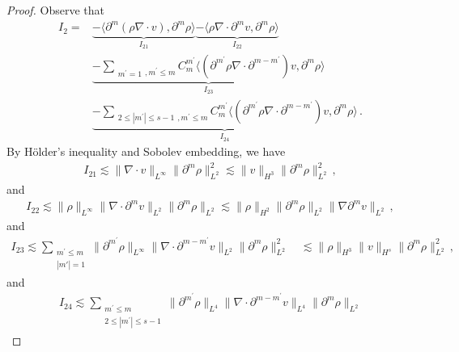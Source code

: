 \documentclass[reqno,11pt]{amsart}
\numberwithin{equation}{section}
\def\p{\partial}
\begin{document}
\begin{proof}
Observe that
 \begin{equation}\label{rho-eq00}
	\begin{aligned}
		I_2= & \underset{I_{21}}{\underbrace{-\langle \p^m(\rho\nabla \cdot v),\p^m \rho \rangle}}\underset{I_{22}}{\underbrace{ -\langle \rho \nabla\cdot \p^m v,\p^m\rho \rangle}} \\
		& \underset{I_{23}}{\underbrace{ - \sum_{\substack{ m^{\prime}=1},m^{\prime}\leq m} C^{m^{\prime}}_{m} \langle (\p^{m^{\prime}} \rho\nabla \cdot  \partial^{m-m^{\prime}}) v,\partial^{m} \rho \rangle}} \\
        & \underset{I_{24}}{\underbrace{ - \sum_{\substack{ 2\leq |m^{\prime}|\leq s-1},m^{\prime}\leq m} C^{m^{\prime}}_{m} \langle (\p^{m^{\prime}} \rho\nabla \cdot \partial^{m-m^{\prime}}) v,\partial^{m} \rho \rangle}}	\,.
	\end{aligned}
\end{equation}
By H\"older's inequality and Sobolev embedding, we have
\begin{equation*}
	\begin{aligned}
I_{21}\lesssim \|\nabla \cdot v\|_{L^\infty} \|\partial^m \rho\|_{L^2}^2 \lesssim \|v\|_{H^3} \|\partial^m \rho\|_{L^2}^2\,,
	\end{aligned}
\end{equation*}
and
\begin{equation*}
	\begin{aligned}
I_{22}\lesssim \|\rho\|_{L^\infty} \|\nabla \cdot \partial^m v\|_{L^2} \|\partial^m \rho\|_{L^2} \lesssim \|\rho\|_{H^2} \|\partial^m \rho\|_{L^2} \|\nabla \partial^m v\|_{L^2}\,,
	\end{aligned}
\end{equation*}
and
    \begin{equation*}
	\begin{aligned}
I_{23}\lesssim \sum_{\substack{m^\prime\leq m \\ |m'| = 1}} \|\partial^{m^\prime} \rho\|_{L^\infty} \|\nabla \cdot \partial^{m - m^\prime} v\|_{L^2} \|\partial^m \rho\|_{L^2}^2 
\quad \lesssim \|\rho\|_{H^3} \|v\|_{H^s} \|\partial^m \rho\|_{L^2}^2 \,,
	\end{aligned}
\end{equation*}
and
\begin{equation*}
	\begin{aligned}
I_{24}\lesssim \sum_{\substack{m^\prime \leq m \\ 2 \leq |m^\prime| \leq s-1}} \|\partial^{m^\prime} \rho\|_{L^4} \|\nabla \cdot \partial^{m - m^\prime} v\|_{L^4} \|\partial^m \rho\|_{L^2} 

\end{aligned}
\end{equation*}
\end{proof}
\end{document}
